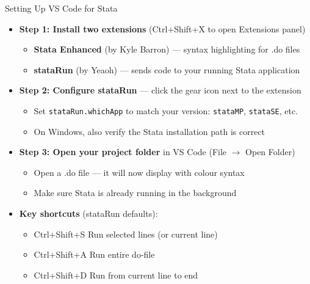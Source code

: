\documentclass[hyperref={pdfpagelabels=false}]{beamer}
\begin{document}

\begin{frame}[fragile]{Setting Up VS Code for Stata}

\begin{itemize}
	\item \textbf{Step 1: Install two extensions} (Ctrl+Shift+X to open Extensions panel)
	\vspace{0.1cm}
	\begin{itemize}
		\item \textbf{Stata Enhanced} (by Kyle Barron) --- syntax highlighting for .do files
		\vspace{0.1cm}
		\item \textbf{stataRun} (by Yeaoh) --- sends code to your running Stata application
	\end{itemize}
	\vspace{0.25cm}
	\item \textbf{Step 2: Configure stataRun} --- click the gear icon next to the extension
	\vspace{0.1cm}
	\begin{itemize}
		\item Set \texttt{stataRun.whichApp} to match your version: \texttt{stataMP}, \texttt{stataSE}, etc.
		\vspace{0.1cm}
		\item On Windows, also verify the Stata installation path is correct
	\end{itemize}
	\vspace{0.25cm}
	\item \textbf{Step 3: Open your project folder} in VS Code (File $\to$ Open Folder)
	\vspace{0.1cm}
	\begin{itemize}
		\item Open a .do file --- it will now display with colour syntax
		\vspace{0.1cm}
		\item Make sure Stata is already running in the background
	\end{itemize}
	\vspace{0.25cm}
	\item \textbf{Key shortcuts} (stataRun defaults):
	\vspace{0.1cm}
	\begin{itemize}
		\item Ctrl+Shift+S \hspace{0.3cm} Run selected lines (or current line)
		\vspace{0.05cm}
		\item Ctrl+Shift+A \hspace{0.3cm} Run entire do-file
		\vspace{0.05cm}
		\item Ctrl+Shift+D \hspace{0.3cm} Run from current line to end
	\end{itemize}
\end{itemize}

\end{frame}
\end{document}
